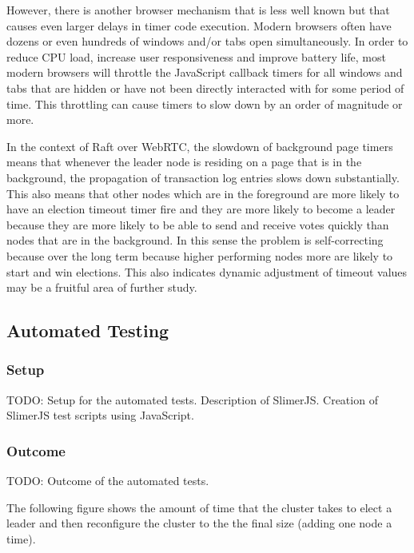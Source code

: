 \documentclass{acmtog} %
\begin{document}
However, there is another browser mechanism that is less well known
but that causes even larger delays in timer code execution. Modern
browsers often have dozens or even hundreds of windows and/or tabs
open simultaneously. In order to reduce CPU load, increase user
responsiveness and improve battery life, most modern browsers will
throttle the JavaScript callback timers for all windows and tabs that
are hidden or have not been directly interacted with for some period
of time. This throttling can cause timers to slow down by an order of
magnitude or more.

In the context of Raft over WebRTC, the slowdown of background page
timers means that whenever the leader node is residing on a page that
is in the background, the propagation of transaction log entries slows
down substantially. This also means that other nodes which are in the
foreground are more likely to have an election timeout timer fire and
they are more likely to become a leader because they are more likely
to be able to send and receive votes quickly than nodes that are in
the background. In this sense the problem is self-correcting because
over the long term because higher performing nodes more are likely to
start and win elections. This also indicates dynamic adjustment of
timeout values may be a fruitful area of further study.

\subsection{Automated Testing}

\subsubsection{Setup}

TODO: Setup for the automated tests. Description of SlimerJS. Creation of SlimerJS test scripts using JavaScript.

\subsubsection{Outcome}

TODO: Outcome of the automated tests.

The following figure shows the amount of time that the cluster takes to
elect a leader and then reconfigure the cluster to the the final size
(adding one node a time).

\end{document}
